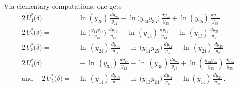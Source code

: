 \documentclass[11pt]{amsart}
\begin{document}
Via elementary computations, one gets 
\begin{align*}
 2\, U_1^*\big( \delta\big) = &\, 
\ln  {(  {y_{25}} )} \, \frac{ {dy_{24}}}{ {y_{24}}}-\ln  {\big(  {y_{24}}  {y_{35}} \big)}\,  \frac{ {dy_{25}}}{ {y_{25}}}+
\ln  {(  {y_{25}} )}\,  
\frac{ {dy_{35}}}{ {y_{35}}}
\\ 
 2\,U_2^*\big( \delta\big) = &\, 
\ln  \bigg( 
\frac{ {y_{14}}  {y_{35}}}{ {y_{13}}}
\bigg)\, \, \frac{  {dy_{13}}}{ {y_{13}}}-
\ln  \, (  {y_{13}} )\, 
\frac{  {dy_{14}}}{ {y_{14}}}-
\ln \,  (  {y_{13}} )\, 
\frac{  {dy_{35}}}{ {y_{35}}}
\\ 
2\,U_3^*\big( \delta\big) = &\, 
 \ln \, (  {y_{24}} )\,
\frac{  {dy_{14}}}{ {y_{14}}}-
\ln \, \big(  {y_{14}}  {y_{25}} \big)
\, 
\frac{  {dy_{24}}}{ {y_{24}}}+
\ln \,(  {y_{24}} )\, 
\frac{  {dy_{25}}}{ {y_{25}}}
\\ 
 2\,U_4^*\big( \delta\big) = &\, 
- \ln  \,(  {y_{35}} )  \, 
\frac{  {dy_{13}}}{ {y_{13}}}-
\ln\, (  {y_{35}} )\, 
\frac{ {dy_{25}}}{ {y_{25}}}+
 \ln \left(\,  \frac{ {y_{13}}  {y_{25}}}{ {y_{35}}}\right)\, 
\frac{  {dy_{35}}}{ {y_{35}}}
\\ 
\mbox{and }\quad  
2\,  U_5^*\big( \delta\big) = &\, 
 \ln \, (  {y_{14}} )\, 
\frac{ {dy_{13}}}{ {y_{13}}}-
\ln \,  \big(  {y_{13}}  {y_{24}} \big) \, 
\frac{ {dy_{14}}}{ {y_{14}}}+
\ln  (  {y_{14}} )\, 
\frac{  {dy_{24}}}{ {y_{24}}}
\, .
\end{align*}
\end{document}
